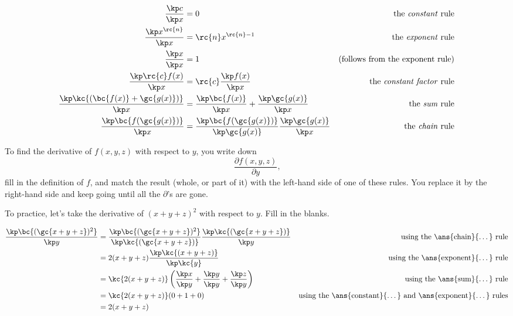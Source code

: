 \documentclass[11pt]{article}
\begin{document}
\begin{align*}
	\frac{\kp c}{\kp x}     &=0        & \text{ the \emph{constant} rule} \\
	\frac{\kp x^\rc{n}}{\kp x}   &=\rc{n}x^{\rc{n}-1} & \text{the \emph{exponent} rule} \\
	\frac{\kp x}{\kp x}     &= 1       & \text{(follows from the exponent rule)} \\
	\frac{\kp \rc{c}f(x)}{\kp x} &= \rc{c}\frac{\kp f(x)}{\kp x} & \text{the \emph{constant factor} rule} \\
	\frac{\kp \kc{\left ( \bc{f(x)} + \gc{g(x)}\right )}}{\kp x} &= \frac{\kp \bc{f(x)}}{\kp x} + \frac{\kp \gc{g(x)}}{\kp x} & \text{the \emph{sum} rule} \\
	\frac{\kp \bc{f(\gc{g(x)})} }{\kp x} &= \frac{\kp \bc{f(\gc{g(x)})}}{\kp \gc{g(x)}}\frac{\kp \gc{g(x)}}{\kp x} & \text{the \emph{chain} rule} \\
\end{align*}

To find the derivative of $f(x, y, z)$ with respect to $y$, you write down 
\[
\frac{\partial f(x, y, z)}{\partial y} \text{,}\]
fill in the definition of $f$, and match the result (whole, or part of it) with the left-hand side of one of these rules. You replace it by the right-hand side and keep going until all the $\partial$'s are gone.

\begin{Exercise}
\noindent To practice, let's take the 	derivative of $(x + y + z)^2$ with respect to $y$. Fill in the blanks.

\begin{align*}
\frac{\kp \bc{(\gc{x + y + z})^2}}{\kp y} &= \frac{\kp \bc{(\gc{x + y + z})^2}}{\kp \kc{(\gc{x + y + z})}}\frac{\kp \kc{(\gc{x + y + z})}}{\kp y} & \text{using the \ans{chain}{\ldots} rule} \\
 &= 2(x + y + z)\frac{\kp \kc{(x + y + z)}}{\kp \kc{y}} & \text{using the \ans{exponent}{\ldots} rule} \\
 &= \kc{2(x + y + z)}\left (\frac{\kp x}{\kp y} + \frac{\kp y}{\kp y} + \frac{\kp z}{\kp y} \right) & \text{using the \ans{sum}{\ldots} rule} \\
  &= \kc{2(x + y + z)}(0 + 1 + 0) & \text{using the \ans{constant}{\ldots} and \ans{exponent}{\ldots} rules} \\
  &=  2(x + y + z) & \\
\end{align*}

\end{Exercise}
\end{document}
